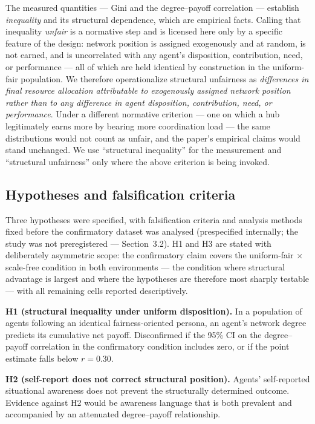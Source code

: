 \documentclass[11pt,a4paper]{article}
\begin{document}
The measured quantities --- Gini and the degree--payoff correlation ---
establish \emph{inequality} and its structural dependence, which are
empirical facts. Calling that inequality \emph{unfair} is a normative
step and is licensed here only by a specific feature of the design:
network position is assigned exogenously and at random, is not earned,
and is uncorrelated with any agent's disposition, contribution, need,
or performance --- all of which are held identical by construction in
the uniform-fair population. We therefore operationalize structural
unfairness as \emph{differences in final resource allocation
attributable to exogenously assigned network position rather than to
any difference in agent disposition, contribution, need, or
performance}. Under a different normative criterion --- one on which a
hub legitimately earns more by bearing more coordination load --- the
same distributions would not count as unfair, and the paper's
empirical claims would stand unchanged. We use ``structural
inequality'' for the measurement and ``structural unfairness'' only
where the above criterion is being invoked.

\subsection{Hypotheses and falsification criteria}

Three hypotheses were specified, with falsification criteria and
analysis methods fixed before the confirmatory dataset was analysed
(prespecified internally; the study was not preregistered ---
Section~3.2). H1 and H3 are stated with deliberately asymmetric
scope: the confirmatory claim covers the uniform-fair $\times$
scale-free condition in both environments --- the condition where
structural advantage is largest and where the hypotheses are therefore
most sharply testable --- with all remaining cells reported
descriptively.

\textbf{H1 (structural inequality under uniform disposition).} In a
population of agents following an identical fairness-oriented persona,
an agent's network degree predicts its cumulative net payoff.
Disconfirmed if the 95\% CI on the degree--payoff correlation in the
confirmatory condition includes zero, or if the point estimate falls
below $r=0.30$.

\textbf{H2 (self-report does not correct structural position).}
Agents' self-reported situational awareness does not prevent the
structurally determined outcome. Evidence against H2 would be
awareness language that is both prevalent and accompanied by an
attenuated degree--payoff relationship.
\end{document}
